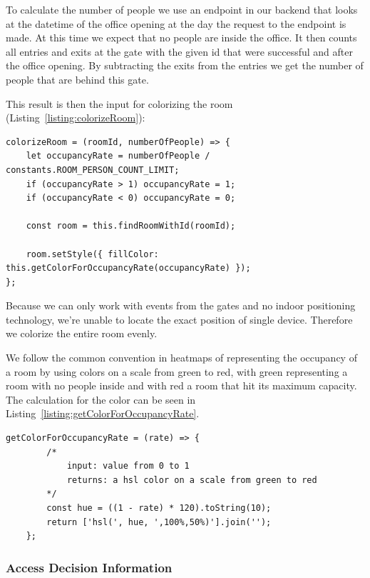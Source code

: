 To calculate the number of people we use an endpoint in our backend that looks at the datetime of the office opening at the day the request to the endpoint is made. At this time we expect that no people are inside the office. It then counts all entries and exits at the gate with the given id that were successful and after the office opening. By subtracting the exits from the entries we get the number of people that are behind this gate.

This result is then the input for colorizing the room (Listing~\ref{listing:colorizeRoom}):

\begin{lstlisting}[label={listing:colorizeRoom},caption={Function for colorizing a room}]
colorizeRoom = (roomId, numberOfPeople) => {
    let occupancyRate = numberOfPeople / constants.ROOM_PERSON_COUNT_LIMIT;
    if (occupancyRate > 1) occupancyRate = 1;
    if (occupancyRate < 0) occupancyRate = 0;

    const room = this.findRoomWithId(roomId);

    room.setStyle({ fillColor: this.getColorForOccupancyRate(occupancyRate) });
};
\end{lstlisting}

Because we can only work with events from the gates and no indoor positioning technology, we're unable to locate the exact position of single device. Therefore we colorize the entire room evenly.

We follow the common convention in heatmaps of representing the occupancy of a room by using colors on a scale from green to red, with green representing a room with no people inside and with red a room that hit its maximum capacity. The calculation for the color can be seen in Listing~\ref{listing:getColorForOccupancyRate}.

\begin{lstlisting}[label={listing:getColorForOccupancyRate},caption={Function for calculating color based on occupancy}]
    getColorForOccupancyRate = (rate) => {
        /*
            input: value from 0 to 1
            returns: a hsl color on a scale from green to red
        */
        const hue = ((1 - rate) * 120).toString(10);
        return ['hsl(', hue, ',100%,50%)'].join('');
    };
\end{lstlisting}

\subsubsection{Access Decision Information}

